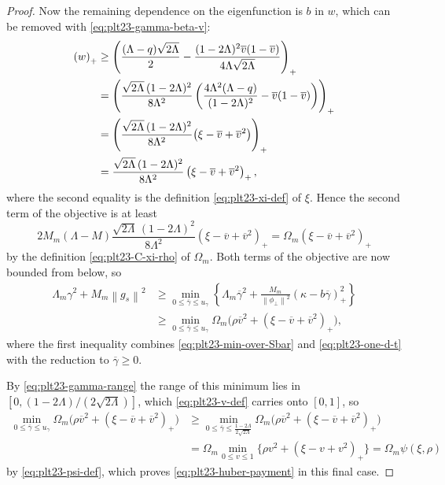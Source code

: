 ﻿\documentclass[11pt]{article}
\numberwithin{equation}{section}
\newcommand{\norm}[1]{\left\lVert #1\right\rVert}
\newcommand{\pos}[1]{\left(#1\right)_{+}}
\begin{document}
\begin{proof}
  Now the remaining dependence on the eigenfunction is $b$ in $w$, which can be removed with \eqref{eq:plt23-gamma-beta-v}:
  \begin{align}
    \pos w
    &\ge\pos{\frac{(\Lambda-q)\sqrt{2\Lambda}}{2}
    -\frac{(1-2\Lambda)^2\overline v(1-\overline v)}{4\Lambda\sqrt{2\Lambda}}}\notag\\
    &=\pos{\frac{\sqrt{2\Lambda}\,(1-2\Lambda)^2}{8\Lambda^2}
    \left(\frac{4\Lambda^2(\Lambda-q)}{(1-2\Lambda)^2}-\overline v(1-\overline v)\right)}\notag\\
    &=\pos{\frac{\sqrt{2\Lambda}\,(1-2\Lambda)^2}{8\Lambda^2}
    \bigl(\xi-\overline v+\overline v^2\bigr)}\notag\\
    &=\frac{\sqrt{2\Lambda}\,(1-2\Lambda)^2}{8\Lambda^2}
    \pos{\xi-\overline v+\overline v^2},\label{eq:plt23-one-d-gamma}
  \end{align}
  where the second equality is the definition \eqref{eq:plt23-xi-def} of $\xi$.
  Hence the second term of the objective is at least
  \[
    2M_m(\Lambda-M)\frac{\sqrt{2\Lambda}\,(1-2\Lambda)^2}{8\Lambda^2}
    \pos{\xi-\overline v+\overline v^2}
    =\Omega_m\pos{\xi-\overline v+\overline v^2}
  \]
  by the definition \eqref{eq:plt23-C-xi-rho} of $\Omega_m$.
  Both terms of the objective are now bounded from below, so
  \begin{align*}
    \Lambda_m\gamma^2+M_m\norm{g_s}^2
    &\ge\min_{0\le\overline\gamma\le u_\gamma}
    \left\{
    \Lambda_m\overline\gamma^2
    +\frac{M_m}{\norm{\phi_\perp}^2}\pos{\kappa-b\overline\gamma}^2
    \right\}\\
    &\ge\min_{0\le\overline\gamma\le u_\gamma}
    \Omega_m\bigl(\rho\overline v^2+\pos{\xi-\overline v+\overline v^2}\bigr),
  \end{align*}
  where the first inequality combines \eqref{eq:plt23-min-over-Sbar} and \eqref{eq:plt23-one-d-t} with the reduction to $\overline\gamma\ge0$.

  By \eqref{eq:plt23-gamma-range} the range of this minimum lies in $[0,(1-2\Lambda)/(2\sqrt{2\Lambda})]$, which \eqref{eq:plt23-v-def} carries onto $[0,1]$, so
  \begin{align*}
    \min_{0\le\overline\gamma\le u_\gamma}
    \Omega_m\bigl(\rho\overline v^2+\pos{\xi-\overline v+\overline v^2}\bigr)
    &\ge\min_{0\le\overline\gamma\le\frac{1-2\Lambda}{2\sqrt{2\Lambda}}}
    \Omega_m\bigl(\rho\overline v^2+\pos{\xi-\overline v+\overline v^2}\bigr)\\
    &=\Omega_m\min_{0\le v\le1}
    \bigl\{\rho v^2+\pos{\xi-v+v^2}\bigr\}
    =\Omega_m\psi(\xi,\rho)
  \end{align*}
  by \eqref{eq:plt23-psi-def}, which proves \eqref{eq:plt23-huber-payment} in this final case.
\end{proof}
\end{document}
